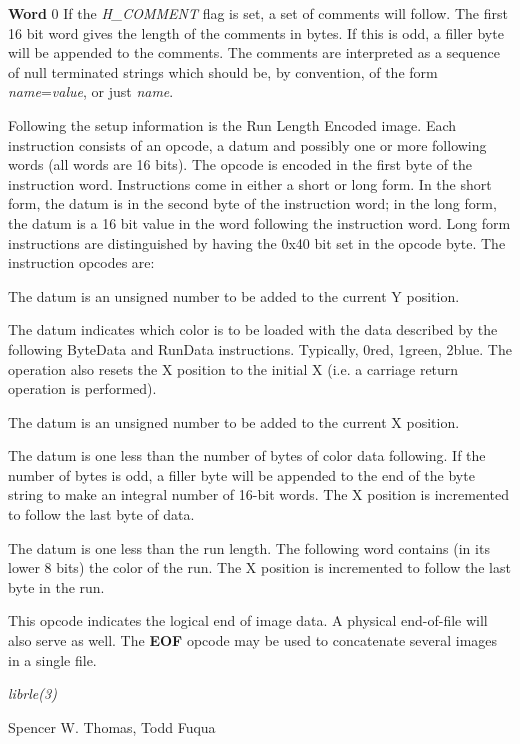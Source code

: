 \begin{TPlist}{{\bf Word} 0}
If the
{\it H\_COMMENT}
flag is set, a set of comments will follow.  The first 16 bit word
gives the length of the comments in bytes.  If this is odd, a filler
byte will be appended to the comments.  The comments are interpreted
as a sequence of null terminated strings which should be, by
convention, of the form
{\it name}{\rm =}{\it value}{\rm ,}
or just
{\it name}{\rm .}

Following the setup information is the Run Length Encoded image.  Each
instruction consists of an opcode, a datum and possibly one or
more following words (all words are 16 bits).  The opcode is encoded in the
first byte of the instruction word.  Instructions come in either a short or
long form.  In the short form, the datum is in the second byte of the
instruction word; in the long form, the datum is a 16 bit value in the word
following the instruction word.  Long form instructions are distinguished by
having the 0x40 bit set in the opcode byte.
The instruction opcodes are:
\item[{{\bf SkipLines} (1)}]
The datum is an unsigned number to be added to the current Y position.
\item[{{\bf SetColor} (2)}]
The datum indicates which color is to be loaded with the data described by the
following ByteData and RunData instructions.  Typically,
0red, 1green, 2blue.  The
operation also resets the X position to the initial X (i.e. a carriage return
operation is performed).
\item[{{\bf SkipPixels} (3)}]
The datum is an unsigned number to be added to the current X
position.
\item[{{\bf ByteData} (5)}]
The datum is one less than the number of bytes of color data following.  If the
number of bytes is odd, a filler byte will be appended to the end of the byte
string to make an integral number of 16-bit words.  The X position is
incremented to follow the last byte of data.
\item[{{\bf RunData} (6)}]
The datum is one less than the run length.  The following word contains (in its
lower 8 bits) the color of the run.  The X position is incremented to follow
the last byte in the run.
\item[{{\bf EOF} (7)}]
This opcode indicates the logical end of image data.  A physical
end-of-file will also serve as well.  The 
{\bf EOF}
opcode may be used to concatenate several images in a single file.
\end{TPlist}
{\it librle(3)}
\par
Spencer W. Thomas, Todd Fuqua

